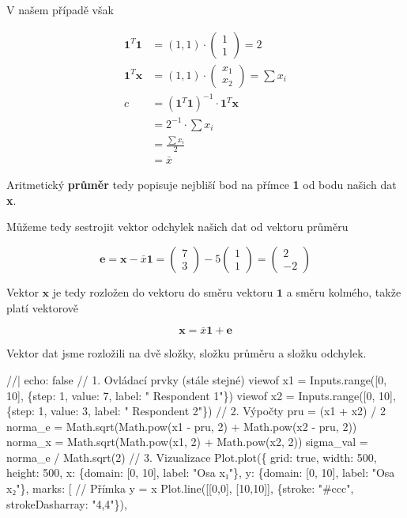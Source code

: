 \documentclass[
  czech,
  11pt,
  letterpaper,
  DIV=11,
  numbers=noendperiod]{scrreprt}
\newenvironment{Shaded}{\begin{snugshade}}{\end{snugshade}}
\newcommand{\NormalTok}[1]{\textcolor[rgb]{0.00,0.23,0.31}{#1}}
\begin{document}
\begin{tcolorbox}
V našem případě však

\begin{align}
  \mathbf{1}^T \mathbf{1} &= (1,1) \cdot \begin{pmatrix} 1 \\ 1   \end{pmatrix} = 2 \\
  \mathbf{1}^T\mathbf{x}  &= (1,1) \cdot \begin{pmatrix} x_1\\x_2 \end{pmatrix} =\sum x_i\\
  c                       &= (\mathbf{1}^T \mathbf{1})^{-1} \cdot \mathbf{1}^T\mathbf{x}\\
                          &= 2^{-1} \cdot \sum x_i\\
                          &= \frac{\sum x_i}{2} \\
                          &= \bar{x}
  \end{align}

Aritmetický \textbf{průměr} tedy popisuje nejbliší bod na přímce
\textbf{1} od bodu našich dat \textbf{x}.

Můžeme tedy sestrojit vektor odchylek našich dat od vektoru průměru

\[
  \mathbf{e}=\mathbf{x}-\bar{x}\mathbf{1}=\begin{pmatrix} 7\\3\end{pmatrix}-5\begin{pmatrix}1\\ 1\end{pmatrix}=\begin{pmatrix} 2\\ -2\end{pmatrix}
\]

Vektor \(\mathbf{x}\) je tedy rozložen do vektoru do směru vektoru
\(\mathbf{1}\) a směru kolmého, takže platí vektorově

\[\mathbf{x}=\bar{x}\mathbf{1}+\mathbf{e}\]

Vektor dat jsme rozložili na dvě složky, složku průměru a složku
odchylek.

\begin{Shaded}
\begin{Highlighting}[]
\NormalTok{//| echo: false}
\NormalTok{// 1. Ovládací prvky (stále stejné)}
\NormalTok{viewof x1 = Inputs.range([0, 10], \{step: 1, value: 7, label: " Respondent 1"\})}
\NormalTok{viewof x2 = Inputs.range([0, 10], \{step: 1, value: 3, label: " Respondent 2"\})}
\NormalTok{// 2. Výpočty}
\NormalTok{pru = (x1 + x2) / 2}
\NormalTok{norma\_e = Math.sqrt(Math.pow(x1 {-} pru, 2) + Math.pow(x2 {-} pru, 2))}
\NormalTok{norma\_x = Math.sqrt(Math.pow(x1, 2) + Math.pow(x2, 2))}
\NormalTok{sigma\_val = norma\_e / Math.sqrt(2)}
\NormalTok{// 3. Vizualizace}
\NormalTok{Plot.plot(\{}
\NormalTok{  grid: true,}
\NormalTok{  width: 500,}
\NormalTok{  height: 500,}
\NormalTok{  x: \{domain: [0, 10], label: "Osa x₁"\},}
\NormalTok{  y: \{domain: [0, 10], label: "Osa x₂"\},}
\NormalTok{  marks: [}
\NormalTok{    // Přímka y = x}
\NormalTok{    Plot.line([[0,0], [10,10]], \{stroke: "\#ccc", strokeDasharray: "4,4"\}),}
    

\end{Highlighting}
\end{Shaded}
\end{tcolorbox}
\end{document}
